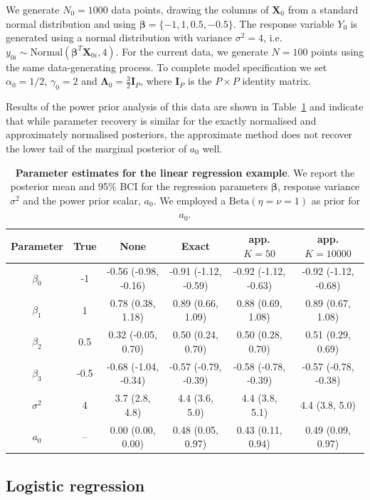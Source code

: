 \documentclass[a4paper, notitlepage, 11pt]{article}
\begin{document}
We generate $N_0 = 1000$ data points, drawing the columns of $\boldsymbol X_0$ from a standard normal distribution and using $\boldsymbol \beta = \{ -1, 1, 0.5, -0.5\}$.
The response variable $Y_0$ is generated using a normal distribution with variance $\sigma^2 = 4$, i.e. $y_{0i} \sim \text{Normal}(\boldsymbol\beta^T \boldsymbol X_{0i}, 4)$.
For the current data, we generate $N = 100$ points using the same data-generating process.
To complete model specification we set $\alpha_0 = 1/2$, $\gamma_0 = 2$ and $\boldsymbol\Lambda_0 = \frac{3}{2}\boldsymbol I_P$, where $\boldsymbol I_P$ is the $P \times P$ identity matrix.

Results of the power prior analysis of this data are shown in Table~\ref{tab:results_NIGregression} and indicate that while parameter recovery is similar for the exactly normalised and approximately normalised posteriors, the approximate method does not recover the lower tail of the marginal posterior of $a_0$ well.
\begin{table}[!ht]
\label{tab:results_NIGregression}
\caption{\textbf{Parameter estimates for the linear regression example}.
We report the posterior mean and 95\% BCI for the regression parameters $\boldsymbol\beta$, response variance $\sigma^2$ and the power prior scalar, $a_0$.
We employed a  $\text{Beta}(\eta = \nu = 1)$ as prior for $a_0$.
}
{\small
\begin{tabular}{cccccc}
\hline 
 Parameter & True & None & Exact & app. $K = 50$ & app. $K = 10000$ \\
 \hline
$\beta_0$ & -1 & -0.56 (-0.98, -0.16) & -0.91 (-1.12, -0.59) & -0.92 (-1.12, -0.63) & -0.92 (-1.12, -0.68) \\
$\beta_1$ & 1 & 0.78 (0.38, 1.18) & 0.89 (0.66, 1.09) & 0.88 (0.69, 1.08) & 0.89 (0.67, 1.08) \\
$\beta_2$ & 0.5 & 0.32 (-0.05, 0.70) & 0.50 (0.24, 0.70) & 0.50 (0.28, 0.70) & 0.51 (0.29, 0.69) \\
$\beta_3$ & -0.5 & -0.68 (-1.04, -0.34) & -0.57 (-0.79, -0.39) & -0.58 (-0.78, -0.39) & -0.57 (-0.78, -0.38) \\
$\sigma^2$ & 4 & 3.7 (2.8, 4.8) & 4.4 (3.6, 5.0) & 4.4 (3.8, 5.1) & 4.4 (3.8, 5.0) \\
$a_0$ & -- & 0.00 (0.00, 0.00) & 0.48 (0.05, 0.97) &0.43 (0.11, 0.94) & 0.49 (0.09, 0.97)\\
\hline
\end{tabular}
}
\end{table}

\subsection{Logistic regression}
\label{sec:logistic_regression}
\end{document}
